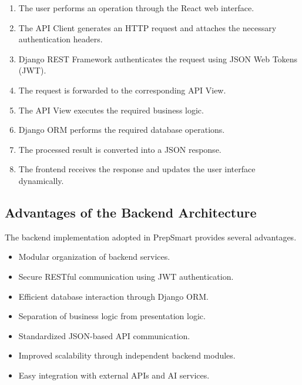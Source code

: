 \begin{enumerate}

\item The user performs an operation through the React web interface.

\item The API Client generates an HTTP request and attaches the necessary authentication headers.

\item Django REST Framework authenticates the request using JSON Web Tokens (JWT).

\item The request is forwarded to the corresponding API View.

\item The API View executes the required business logic.

\item Django ORM performs the required database operations.

\item The processed result is converted into a JSON response.

\item The frontend receives the response and updates the user interface dynamically.

\end{enumerate}

\subsection{Advantages of the Backend Architecture}

The backend implementation adopted in PrepSmart provides several advantages.

\begin{itemize}

\item Modular organization of backend services.

\item Secure RESTful communication using JWT authentication.

\item Efficient database interaction through Django ORM.

\item Separation of business logic from presentation logic.

\item Standardized JSON-based API communication.

\item Improved scalability through independent backend modules.

\item Easy integration with external APIs and AI services.

\end{itemize}

